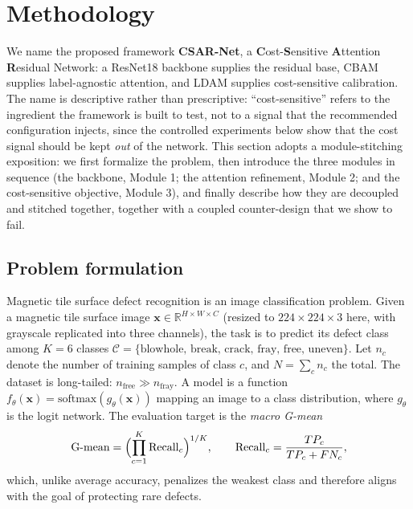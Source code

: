 \documentclass[a4paper,fleqn]{cas-sc}
\begin{document}
\begin{sloppypar}
	\section{Methodology}
	\label{sec:method}

	\par{
		We name the proposed framework \textbf{CSAR-Net}, a \textbf{C}ost-\textbf{S}ensitive \textbf{A}ttention \textbf{R}esidual Network: a ResNet18 backbone \citep{he2016deep} supplies the residual base, CBAM supplies label-agnostic attention, and LDAM supplies cost-sensitive calibration. The name is descriptive rather than prescriptive: ``cost-sensitive'' refers to the ingredient the framework is built to test, not to a signal that the recommended configuration injects, since the controlled experiments below show that the cost signal should be kept \emph{out} of the network. This section adopts a module-stitching exposition: we first formalize the problem, then introduce the three modules in sequence (the backbone, Module 1; the attention refinement, Module 2; and the cost-sensitive objective, Module 3), and finally describe how they are decoupled and stitched together, together with a coupled counter-design that we show to fail.
	}

	\subsection{Problem formulation}
	\label{sec:problem}
	\par{
		Magnetic tile surface defect recognition is an image classification problem. Given a magnetic tile surface image $\mathbf{x}\in\mathbb{R}^{H\times W\times C}$ (resized to $224\times224\times3$ here, with grayscale replicated into three channels), the task is to predict its defect class among $K=6$ classes $\mathcal{C}=\{\text{blowhole, break, crack, fray, free, uneven}\}$. Let $n_c$ denote the number of training samples of class $c$, and $N=\sum_c n_c$ the total. The dataset is long-tailed: $n_{\text{free}}\gg n_{\text{fray}}$. A model is a function $f_\theta(\mathbf{x})=\text{softmax}(g_\theta(\mathbf{x}))$ mapping an image to a class distribution, where $g_\theta$ is the logit network. The evaluation target is the \emph{macro G-mean}
		\begin{equation}
			\text{G-mean}=\Bigl(\prod_{c=1}^{K}\mathrm{Recall}_c\Bigr)^{1/K},\qquad
			\mathrm{Recall}_c=\frac{TP_c}{TP_c+FN_c},
			\label{eq:gmean}
		\end{equation}
		which, unlike average accuracy, penalizes the weakest class and therefore aligns with the goal of protecting rare defects.
	}


\end{sloppypar}
\end{document}
